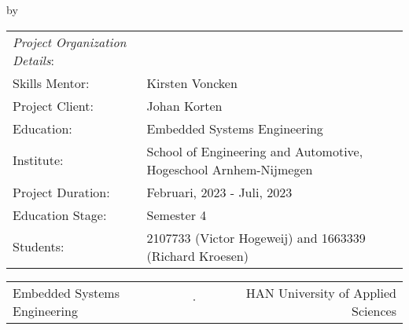 \begin{titlepage}

\begin{center}

{\makeatletter
\largetitlestyle\fontsize{45}{45}\selectfont\@title
\makeatother}

\bigskip

{\makeatletter
\vspace{12mm}
\ifdefvoid{\@subtitle}{}{\largetitlestyle\fontsize{20}{20}\selectfont\@subtitle}
\makeatother}

\bigskip
\bigskip

by

\bigskip
\bigskip

{\makeatletter
\largetitlestyle\fontsize{25}{25}\selectfont\@author
\makeatother}

\bigskip
\bigskip



\vfill

\begin{tabular}{ll}
\textit{Project Organization Details}:       \\
Skills Mentor:                          & Kirsten Voncken \\ 
Project Client:                    & Johan Korten \\
Education:                          & Embedded Systems Engineering \\
Institute:                          & School of Engineering and Automotive, Hogeschool Arnhem-Nijmegen\\
Project Duration: & Februari, 2023 - Juli, 2023 \\
Education Stage: &Semester 4\\
Students: & 2107733 (Victor Hogeweij) and 1663339 (Richard Kroesen)\\
\end{tabular}

\vspace*{1cm}


\vspace*{2cm}
  \begin{center}
    \begin{tabular}{lcr}
      Embedded Systems Engineering & $\cdot$ & HAN University of Applied Sciences
    \end{tabular}
  \end{center}

\end{center}

\end{titlepage}
